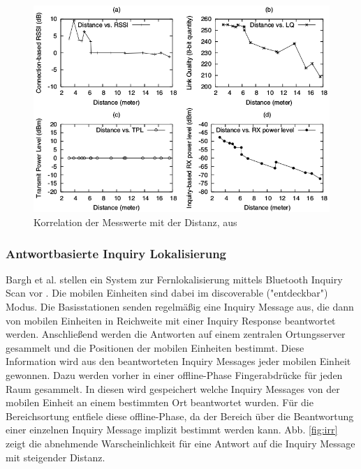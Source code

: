 \begin{figure}[h]
  \centering
	\includegraphics[width=\textwidth]{images/bluetoothmess.png}
  \caption{Korrelation der Messwerte mit der Distanz, aus \cite{hossain2007comprehensive}}
  \label{fig:bluetoothmess}
\end{figure}

\subsubsection{Antwortbasierte Inquiry Lokalisierung}
Bargh et al. stellen ein System zur Fernlokalisierung mittels Bluetooth Inquiry Scan vor \cite{bargh2008indoor}.
Die mobilen Einheiten sind dabei im discoverable ("entdeckbar") Modus.
Die Basisstationen senden regelmäßig eine Inquiry Message aus, die dann von mobilen Einheiten in Reichweite mit einer Inquiry Response beantwortet werden. 
Anschließend werden die Antworten auf einem zentralen Ortungsserver gesammelt und die Positionen der mobilen Einheiten bestimmt.
Diese Information wird aus den beantworteten Inquiry Messages jeder mobilen Einheit gewonnen.
Dazu werden vorher in einer offline-Phase Fingerabdrücke für jeden Raum gesammelt.
In diesen wird gespeichert welche Inquiry Messages von der mobilen Einheit an einem bestimmten Ort beantwortet wurden.
Für die Bereichsortung entfiele diese offline-Phase, da der Bereich über die Beantwortung einer einzelnen Inquiry Message implizit bestimmt werden kann.
Abb. \ref{fig:irr} zeigt die abnehmende Warscheinlichkeit für eine Antwort auf die Inquiry Message mit steigender Distanz.

